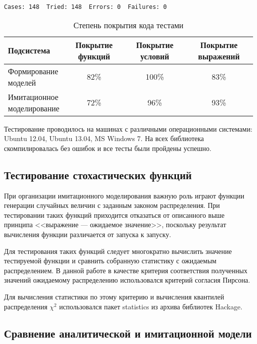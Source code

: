 \begin{verbatim}
Cases: 148  Tried: 148  Errors: 0  Failures: 0
\end{verbatim}

\begin{table}[ht!]
\caption{Степень покрытия кода тестами}
\begin{tabular}{|p{}|c|c|c|}
\hline
Подсистема & Покрытие функций & Покрытие условий & Покрытие выражений\\
\hline
\parbox{0.25\textwidth} {Формирование \\моделей }& 82\% & 100\% & 83\% \\
\hline
\parbox{0.25\textwidth} {Имитационное \\моделирование }& 72\% & 96\% & 93\% \\
\hline
\end{tabular}
\label{tab:coverage}
\end{table}

Тестирование проводилось на машинах с различными операционными системами: Ubuntu 12.04, Ubuntu 13.04, MS Windows 7. На всех библиотека скомпилировалась без ошибок и все тесты были пройдены успешно.


\subsection{Тестирование стохастических функций}

При организации имитационного моделирования важную роль играют функции генерации случайных величин с заданным законом распределения. При тестировании таких функций приходится отказаться от описанного выше принципа <<выражение --- ожидаемое значение>>, поскольку результат вычисления функции различается от запуска к запуску.

Для тестирования таких функций следует многократно вычислить значение тестируемой функции и сравнить собранную статистику с ожидаемым распределением. В данной работе в качестве критерия соответствия полученных значений ожидаемому распределению использовался критерий согласия Пирсона.

Для вычисления статистики по этому критерию и вычисления квантилей распределения $\chi^2$ использовался пакет statistics из архива библиотек Hackage.

\subsection{Сравнение аналитической и имитационной модели}

